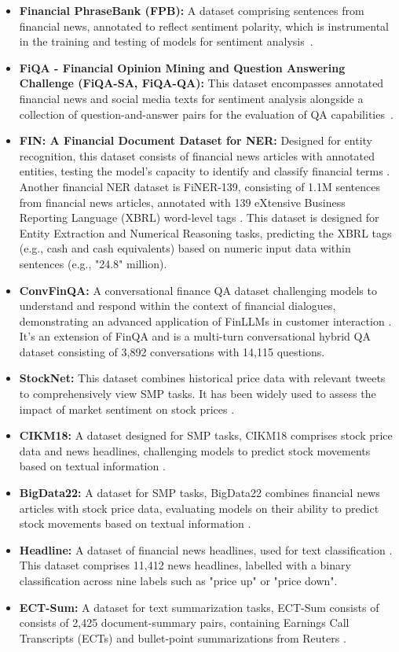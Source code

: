 \begin{itemize}
	\item \textbf{Financial PhraseBank (FPB):} A dataset comprising sentences from financial news, annotated to reflect sentiment polarity, which is instrumental in the training and testing of models for sentiment analysis~\cite{malo2014good}.
	\item \textbf{FiQA - Financial Opinion Mining and Question Answering Challenge (FiQA-SA, FiQA-QA):} This dataset encompasses annotated financial news and social media texts for sentiment analysis alongside a collection of question-and-answer pairs for the evaluation of QA capabilities~\cite{maia2018www}.
	\item \textbf{FIN: A Financial Document Dataset for NER:} {Designed for entity recognition, this dataset consists of financial news articles with annotated entities, testing the model's capacity to identify and classify financial terms \textcite{alvarado2015domain}.
		      Another financial NER dataset is FiNER-139, consisting of 1.1M sentences from financial news articles, annotated with 139 eXtensive Business Reporting Language (XBRL) word-level tags \cite{loukas2022finer}. This dataset is designed for Entity Extraction and Numerical Reasoning tasks, predicting the XBRL tags (e.g., cash and cash equivalents) based on numeric input data within sentences (e.g., "24.8" million).}
	\item \textbf{ConvFinQA:} {A conversational finance QA dataset challenging models to understand and respond within the context of financial dialogues, demonstrating an advanced application of FinLLMs in customer interaction \textcite{chen2022convfinqa}. It's an extension of FinQA and is a multi-turn conversational hybrid QA dataset consisting of 3,892 conversations with 14,115 questions.}
	\item \textbf{StockNet:} {This dataset combines historical price data with relevant tweets to comprehensively view SMP tasks. It has been widely used to assess the impact of market sentiment on stock prices \cite{xu2018stock}.}
	\item \textbf{CIKM18:} {A dataset designed for SMP tasks, CIKM18 comprises stock price data and news headlines, challenging models to predict stock movements based on textual information \cite{wu2018hybrid}.}
	\item \textbf{BigData22:} {A dataset for SMP tasks, BigData22 combines financial news articles with stock price data, evaluating models on their ability to predict stock movements based on textual information \textcite{soun2022accurate}.}
	\item \textbf{Headline:} {A dataset of financial news headlines, used for text classification \cite{sinha2021impact}. This dataset comprises 11,412 news headlines, labelled with a binary classification across nine labels such as "price up" or "price down".}
	\item \textbf{ECT-Sum:} {A dataset for text summarization tasks, ECT-Sum consists of consists of 2,425 document-summary pairs, containing Earnings Call Transcripts (ECTs) and bullet-point summarizations from Reuters \cite{mukherjee2022ectsum}.}
\end{itemize}

